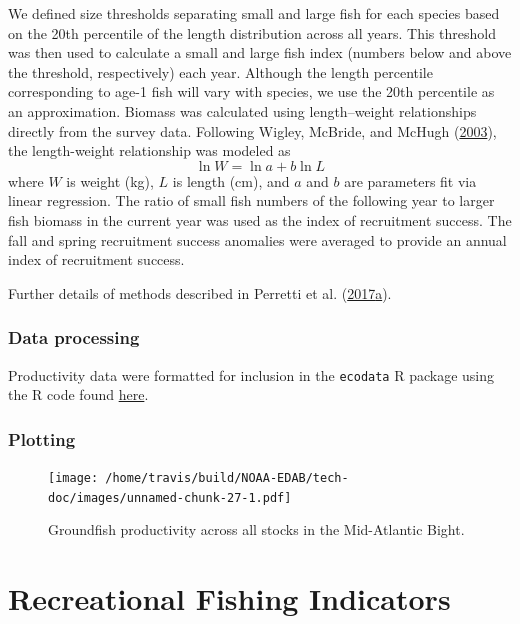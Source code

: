 \documentclass[
]{book}
\begin{document}
We defined size thresholds separating small and large fish for each species based on the 20th percentile of the length distribution across all years. This threshold was then used to calculate a small and large fish index (numbers below and above the threshold, respectively) each year. Although the length percentile corresponding to age-1 fish will vary with species, we use the 20th percentile as an approximation. Biomass was calculated using length--weight relationships directly from the survey data. Following Wigley, McBride, and McHugh (\protect\hyperlink{ref-wigley_length-weight_2003}{2003}), the length-weight relationship was modeled as
\[\ln W = \ln a + b \ln L\]
where \(W\) is weight (kg), \(L\) is length (cm), and \(a\) and \(b\) are parameters fit via linear regression. The ratio of small fish numbers of the following year to larger fish biomass in the current year was used as the index of recruitment success. The fall and spring recruitment success anomalies were averaged to provide an annual index of recruitment success.

Further details of methods described in Perretti et al. (\protect\hyperlink{ref-perretti_regime_2017}{2017}\protect\hyperlink{ref-perretti_regime_2017}{a}).

\hypertarget{data-processing-19}{%
\subsection{Data processing}\label{data-processing-19}}

Productivity data were formatted for inclusion in the \texttt{ecodata} R package using the R code found \href{https://github.com/NOAA-EDAB/ecodata/blob/master/data-raw/get_productivity_anomaly.R}{here}.

\hypertarget{plotting-21}{%
\subsection{Plotting}\label{plotting-21}}

\begin{figure}
\centering
\texttt{[image: /home/travis/build/NOAA-EDAB/tech-doc/images/unnamed-chunk-27-1.pdf]}
\caption{\label{fig:unnamed-chunk-27}Groundfish productivity across all stocks in the Mid-Atlantic Bight.}
\end{figure}

\hypertarget{recreational-fishing-indicators}{%
\chapter{Recreational Fishing Indicators}\label{recreational-fishing-indicators}}
\end{document}
